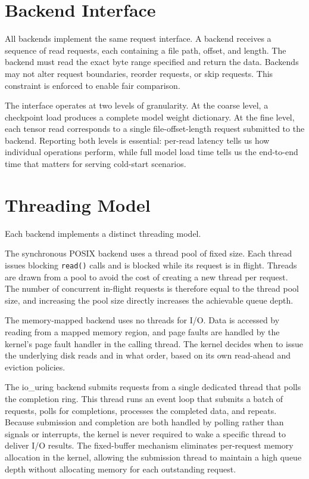 \section{Backend Interface}

All backends implement the same request interface. A backend receives a sequence of read requests, each containing a file path, offset, and length. The backend must read the exact byte range specified and return the data. Backends may not alter request boundaries, reorder requests, or skip requests. This constraint is enforced to enable fair comparison.

The interface operates at two levels of granularity. At the coarse level, a checkpoint load produces a complete model weight dictionary. At the fine level, each tensor read corresponds to a single file-offset-length request submitted to the backend. Reporting both levels is essential: per-read latency tells us how individual operations perform, while full model load time tells us the end-to-end time that matters for serving cold-start scenarios.

\section{Threading Model}

Each backend implements a distinct threading model.

The synchronous POSIX backend uses a thread pool of fixed size. Each thread issues blocking \texttt{read()} calls and is blocked while its request is in flight. Threads are drawn from a pool to avoid the cost of creating a new thread per request. The number of concurrent in-flight requests is therefore equal to the thread pool size, and increasing the pool size directly increases the achievable queue depth.

The memory-mapped backend uses no threads for I/O. Data is accessed by reading from a mapped memory region, and page faults are handled by the kernel's page fault handler in the calling thread. The kernel decides when to issue the underlying disk reads and in what order, based on its own read-ahead and eviction policies.

The io\_uring backend submits requests from a single dedicated thread that polls the completion ring. This thread runs an event loop that submits a batch of requests, polls for completions, processes the completed data, and repeats. Because submission and completion are both handled by polling rather than signals or interrupts, the kernel is never required to wake a specific thread to deliver I/O results. The fixed-buffer mechanism eliminates per-request memory allocation in the kernel, allowing the submission thread to maintain a high queue depth without allocating memory for each outstanding request.

